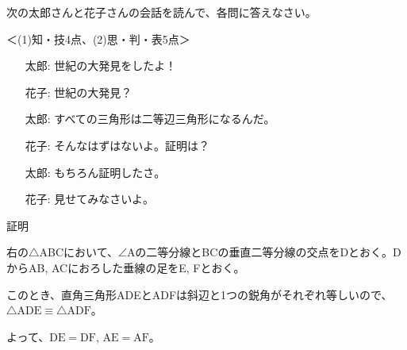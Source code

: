 \documentclass[
  12pt,a4paper,lualatex,ja=standard]{bxjsarticle}
\begin{document}
\begin{flushleft}
\noindent{} \hspace{1pt}次の太郎さんと花子さんの会話を読んで、各問に答えなさい。

%
\begin{flushright}%
\footnotesize{＜(1)知・技4点、(2)思・判・表5点＞}%
\end{flushright}%


\begin{screen}
\begin{itemize}
\item[太郎:] 世紀の大発見をしたよ！
\item[花子:] 世紀の大発見？
\item[太郎:] すべての三角形は二等辺三角形になるんだ。
\item[花子:] そんなはずはないよ。証明は？
\item[太郎:] もちろん証明したさ。
\item[花子:] 見せてみなさいよ。
\end{itemize}

\begin{itembox}[l]{証明}
\begin{multicols}{2}
右の$\triangle$ABCにおいて、$\angle$Aの二等分線とBCの垂直二等分線の交点をDとおく。DからAB, ACにおろした垂線の足をE, Fとおく。

このとき、直角三角形ADEとADFは斜辺と1つの鋭角がそれぞれ等しいので、$\triangle \mbox{ADE} \equiv \triangle \mbox{ADF}$。

よって、$\mbox{DE} = \mbox{DF}, \, \mbox{AE} = \mbox{AF}$。

\columnbreak


\end{multicols}
\end{itembox}
\end{screen}
\end{flushleft}
\end{document}
